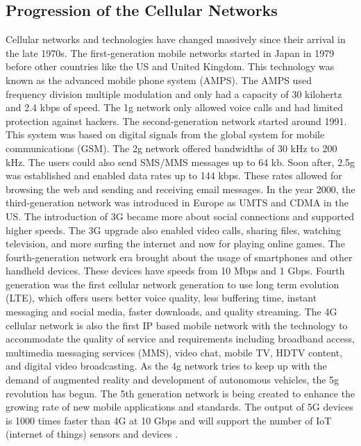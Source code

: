 \documentclass[acmlarge]{acmart}
\begin{document}
\subsection{Progression of the Cellular Networks}
Cellular networks and technologies have changed massively since their arrival in the late 1970s.  The first-generation mobile networks started in Japan in 1979 before other countries like the US and United Kingdom.  This technology was known as the advanced mobile phone system (AMPS).  The AMPS used frequency division multiple modulation and only had a capacity of 30 kilohertz and 2.4 kbps of speed.  The 1g network only allowed voice calls and had limited protection against hackers.  The second-generation network started around 1991.  This system was based on digital signals from the global system for mobile communications (GSM).  The 2g network offered bandwidths of 30 kHz to 200 kHz.  The users could also send SMS/MMS messages up to 64 kb.  Soon after, 2.5g was established and enabled data rates up to 144 kbps.  These rates allowed for browsing the web and sending   and receiving email messages. In the year 2000, the third-generation network was introduced in Europe as UMTS and CDMA in the US.  The introduction of 3G became more about social connections and supported higher speeds.  The 3G upgrade also enabled video calls, sharing files, watching television, and more surfing the internet and now for playing online games.  The fourth-generation network era brought about the usage of smartphones and other handheld devices.  These devices have speeds from 10 Mbps and 1 Gbps.  Fourth generation was the first cellular network generation to use long term evolution (LTE), which offers users better voice quality, less buffering time, instant messaging and social media, faster downloads, and quality streaming.    The 4G cellular network is also the first IP based mobile network with the technology to accommodate the quality of service and requirements including broadband access, multimedia messaging services (MMS), video chat, mobile TV, HDTV content, and digital video broadcasting.  As the 4g network tries to keep up with the demand of augmented reality and development of autonomous vehicles, the 5g revolution has begun.  The 5th generation network is being created to enhance the growing rate of new mobile applications and standards.  The output of 5G devices is 1000 times faster than 4G at 10 Gbps and will support the number of IoT (internet of things) sensors and devices \cite{keenan_2020}.  
\end{document}
